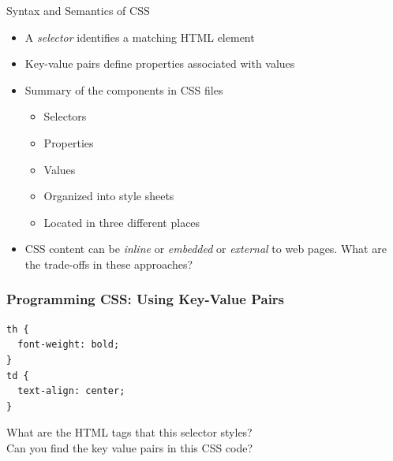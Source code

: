 \documentclass[14pt,aspectratio=169]{beamer}
\begin{document}
%
\begin{frame}{Syntax and Semantics of CSS}
%
  \begin{itemize}
    \item A {\em selector} identifies a matching HTML element
      \vspace*{-.2in}
    \item Key-value pairs define properties associated with values
      \vspace*{-.15in}
    \item Summary of the components in CSS files
      \begin{itemize}
        \item Selectors
        \item Properties
        \item Values
        \item Organized into style sheets
        \item Located in three different places
      \end{itemize}
      \vspace*{-.2in}
    \item CSS content can be {\em inline} or {\em embedded} or {\em external} to web pages.
      What are the trade-offs in these approaches?
  \end{itemize}
%
\end{frame}

%
\begin{frame}[fragile]
  \frametitle{Programming CSS: Using Key-Value Pairs}
  \normalsize
  \hspace*{.25in}
  \begin{minipage}{6in}
    \vspace*{.2in}
    \begin{verbatim}
th {
  font-weight: bold;
}
td {
  text-align: center;
}
    \end{verbatim}
  \end{minipage}
  \vspace*{.05in}
  \begin{center}
    \noindent What are the HTML tags that this selector styles?\\
    \noindent Can you find the key value pairs in this CSS code?\\
  \end{center}
\end{frame}
\end{document}

